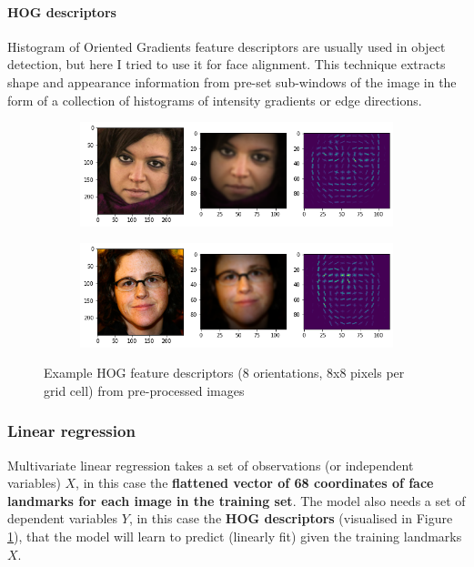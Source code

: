 \documentclass{article}
\begin{document}
\paragraph{HOG descriptors}
Histogram of Oriented Gradients feature descriptors are usually used in object detection, but here I tried to use it for face alignment. This technique extracts shape and appearance information from pre-set sub-windows of the image in the form of a collection of histograms of intensity gradients or edge directions.

\begin{figure}[h]
  \centering
  \begin{subfigure}[b]{.75\textwidth}
    \includegraphics[width=\textwidth]{hog1}
  \end{subfigure}
  \hfill
  \begin{subfigure}[b]{0.75\textwidth}
    \includegraphics[width=\textwidth]{hog5}
  \end{subfigure}
  \hfill
  \caption{Example HOG feature descriptors (8 orientations, 8x8 pixels per grid cell) from pre-processed images}
  \label{fig:hog}
\end{figure}

\subsubsection{Linear regression}\label{section:linear-reg}
Multivariate linear regression takes a set of observations (or independent variables) $X$, in this case the \textbf{flattened vector of 68 coordinates of face landmarks for each image in the training set}. The model also needs a set of dependent variables $Y$, in this case the \textbf{HOG descriptors} (visualised in Figure \ref{fig:hog}), that the model will learn to predict (linearly fit) given the training landmarks $X$.
\end{document}
